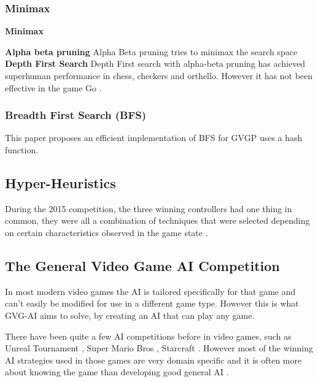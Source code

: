 \documentclass[journal]{IEEEtran}
\begin{document}
		
		
		\subsubsection{Minimax}
			\textbf{Minimax}
				
			\textbf{Alpha beta pruning}
				Alpha Beta pruning tries to minimax the search space \cite{knuth1975analysis}
			\textbf{Depth First Search}
				Depth First search with alpha-beta pruning \cite{knuth1975analysis} has achieved superhuman performance in chess, checkers and orthello. However it has not been effective in the game Go \cite{silver2016mastering}.
			
		
		
		\subsubsection{Breadth First Search (BFS) }\label{sssec:BFS}
			This paper proposes an efficient implementation of BFS for GVGP \cite{EfficientBFS} uses a hash function.

	\subsection{Hyper-Heuristics}
		During the 2015 competition, the three winning controllers had one thing in common, they were all a combination of techniques that were selected depending on certain characteristics observed in the game state \cite{horn2016mcts}.
		

			
		
		

	\subsection{The General Video Game AI Competition} \label{ssec:GVGAIC}
	
		In most modern video games the AI is tailored specifically for that game and can't easily be modified for use in a different game type. However this is what GVG-AI aims to solve, by creating an AI that can play any game. 
		
		There have been quite a few AI competitions before in video games, such as Unreal Tournament \cite{hingston2010new}, Super Mario Bros \cite{shaker2013turing}, Starcraft \cite{ontanon2013survey}. 
		However most of the winning AI strategies used in those games are very domain specific and it is often more about knowing the game than developing good general AI \cite{perez20162014}. 
		 \par
		
\end{document}
